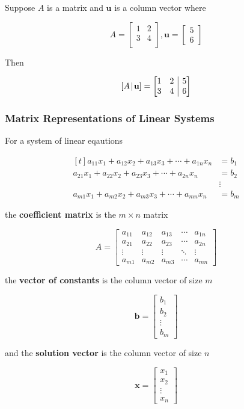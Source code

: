 \documentclass[a4paper,12pt]{article}
\begin{document}
\begin{exm}
  Suppose $A$ is a matrix and $\mathbf{u}$ is a column vector where

  $$A=\begin{bmatrix}
    1 & 2\\
    3 & 4\\
  \end{bmatrix},\mathbf{u}=\begin{bmatrix}
    5\\
    6
  \end{bmatrix}$$

  Then

  $$[A\!\mid\!\mathbf{u}]=\left[ \begin{array}{@{}cc|c@{}}
    1 & 2 & 5\\
    3 & 4 & 6
  \end{array}\right]$$
\end{exm}

\subsubsection{Matrix Representations of Linear Systems}
\begin{dft}
  For a system of linear eqautions

  $$\begin{aligned}[t]
    a_{11}x_{1}+a_{12}x_{2}+a_{13}x_{3}+\cdots+a_{1n}x_{n}&=b_{1}\\
    a_{21}x_{1}+a_{22}x_{2}+a_{23}x_{3}+\cdots+a_{2n}x_{n}&=b_{2}\\
    &\vdots\\
    a_{m1}x_{1}+a_{m2}x_{2}+a_{m3}x_{3}+\cdots+a_{mn}x_{n}&=b_{m}
  \end{aligned}$$\s

  the \textbf{coefficient matrix} is the $m\times n$ matrix

  $$A=\begin{bmatrix}
    a_{11} & a_{12} & a_{13} & \cdots & a_{1n}\\
    a_{21} & a_{22} & a_{23} & \cdots & a_{2n}\\
    \vdots & \vdots & \vdots & \ddots & \vdots\\
    a_{m1} & a_{m2} & a_{m3} & \cdots & a_{mn}
  \end{bmatrix}$$\s

  the \textbf{vector of constants} is the column vector of size $m$

  $$\mathbf{b}=\begin{bmatrix}
    b_{1}\\
    b_{2}\\
    \vdots\\
    b_{m}
  \end{bmatrix}$$\s

  and the \textbf{solution vector} is the column vector of size $n$

  $$\mathbf{x}=\begin{bmatrix}
    x_{1}\\
    x_{2}\\
    \vdots\\
    x_{n}
  \end{bmatrix}$$
\end{dft}\n
\end{document}
